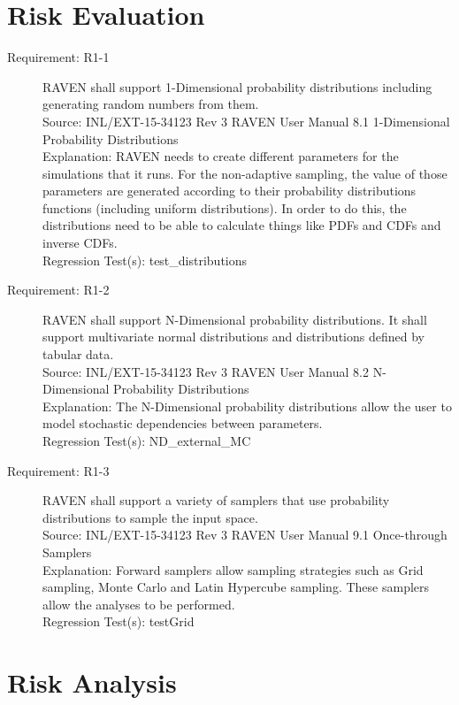 \documentclass{article}
\newcommand{\requirement}[5]{\item[Requirement: #1] #2 \\Source: #3\\Explanation: #4\\Regression Test(s): #5}
\begin{document}
\section{Risk Evaluation}

\begin{description}

\requirement{R1-1}{RAVEN shall support 1-Dimensional probability distributions including generating random numbers from them.}
{INL/EXT-15-34123 Rev 3 RAVEN User Manual 8.1 1-Dimensional Probability Distributions}
{RAVEN needs to create different parameters for the simulations that it runs.  For the non-adaptive sampling, the value of those parameters are generated according to their probability distributions functions (including uniform distributions).  In order to do this, the distributions need to be able to calculate things like PDFs and CDFs and inverse CDFs.}
{test\_distributions}

\requirement{R1-2}{RAVEN shall support N-Dimensional probability distributions.  It shall support multivariate normal distributions and distributions defined by tabular data.}
{INL/EXT-15-34123 Rev 3 RAVEN User Manual 8.2 N-Dimensional Probability Distributions}
{The N-Dimensional probability distributions allow the user to model stochastic dependencies between parameters.}
{ND\_external\_MC}

\requirement{R1-3}{RAVEN shall support a variety of samplers that use probability distributions to sample the input space.}
{INL/EXT-15-34123 Rev 3 RAVEN User Manual 9.1 Once-through Samplers}
{Forward samplers allow sampling strategies such as Grid sampling, Monte Carlo and Latin Hypercube sampling.  These samplers allow the analyses to be performed.}
{testGrid}

\end{description}

\section{Risk Analysis}
\end{document}
